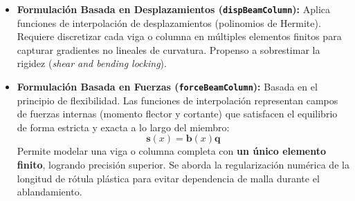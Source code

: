 \documentclass[11pt,letterpaper]{article}
\begin{document}
\begin{modulebox}
\begin{itemize}
    \item \textbf{Formulación Basada en Desplazamientos (\texttt{dispBeamColumn}):}
    Aplica funciones de interpolación de desplazamientos (polinomios de Hermite). Requiere discretizar cada viga o columna en múltiples elementos finitos para capturar gradientes no lineales de curvatura. Propenso a sobrestimar la rigidez (\textit{shear and bending locking}).
    \item \textbf{Formulación Basada en Fuerzas (\texttt{forceBeamColumn}):}
    Basada en el principio de flexibilidad. Las funciones de interpolación representan campos de fuerzas internas (momento flector y cortante) que satisfacen el equilibrio de forma estricta y exacta a lo largo del miembro:
    \begin{equation}
        \mathbf{s}(x) = \mathbf{b}(x) \mathbf{q}
    \end{equation}
    Permite modelar una viga o columna completa con \textbf{un único elemento finito}, logrando precisión superior. Se aborda la regularización numérica de la longitud de rótula plástica para evitar dependencia de malla durante el ablandamiento.
\end{itemize}
\end{modulebox}
\end{document}
